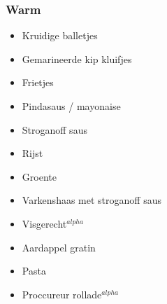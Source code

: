 \subsubsection*{Warm}
\begin{itemize}
	\item	Kruidige balletjes
	\item	Gemarineerde kip kluifjes
	\item	Frietjes
	\item	Pindasaus / mayonaise
	\item	Stroganoff saus
	\item	Rijst
	\item	Groente
	\item	Varkenshaas met stroganoff saus
	\item	Visgerecht$^{alpha}$
	\item	Aardappel gratin
	\item	Pasta
	\item	Proccureur rollade$^{alpha}$
\end{itemize}
